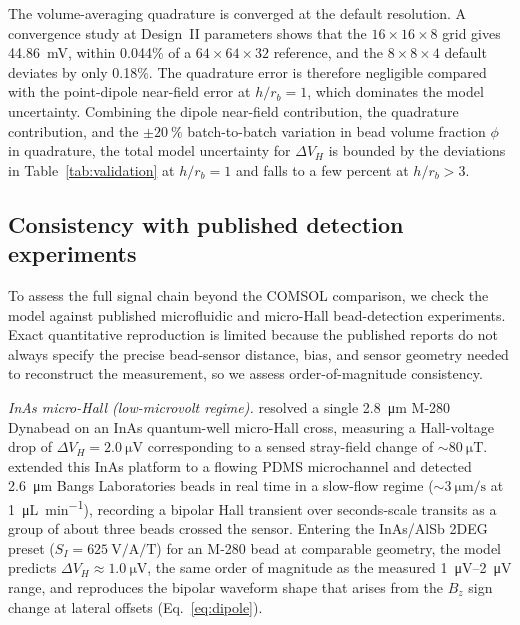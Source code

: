 \documentclass[pdflatex,sn-basic]{sn-jnl}
\theoremstyle{thmstyleone}
\theoremstyle{thmstyletwo}
\theoremstyle{thmstylethree}
\begin{document}
The volume-averaging quadrature is converged at the default resolution. A convergence study at Design~II parameters shows that the $16\times16\times8$ grid gives \SI{44.86}{\milli\volt}, within 0.044\% of a $64\times64\times32$ reference, and the $8\times8\times4$ default deviates by only 0.18\%. The quadrature error is therefore negligible compared with the point-dipole near-field error at $h/r_b = 1$, which dominates the model uncertainty. Combining the dipole near-field contribution, the quadrature contribution, and the ${\pm}\SI{20}{\percent}$ batch-to-batch variation in bead volume fraction $\phi$ \citep{fonnum2005} in quadrature, the total model uncertainty for $\Delta V_H$ is bounded by the deviations in Table~\ref{tab:validation} at $h/r_b = 1$ and falls to a few percent at $h/r_b > 3$.

\subsection{Consistency with published detection experiments}\label{sec:expvalidation}

To assess the full signal chain beyond the COMSOL comparison, we check the model against published microfluidic and micro-Hall bead-detection experiments. Exact quantitative reproduction is limited because the published reports do not always specify the precise bead-sensor distance, bias, and sensor geometry needed to reconstruct the measurement, so we assess order-of-magnitude consistency.

\textit{InAs micro-Hall (low-microvolt regime).} \citet{mihajlovic2005} resolved a single \SI{2.8}{\micro\meter} M-280 Dynabead on an InAs quantum-well micro-Hall cross, measuring a Hall-voltage drop of $\Delta V_H = \SI{2.0}{\micro\volt}$ corresponding to a sensed stray-field change of ${\sim}\SI{80}{\micro\tesla}$. \citet{aledealat2009} extended this InAs platform to a flowing PDMS microchannel and detected \SI{2.6}{\micro\meter} Bangs Laboratories beads in real time in a slow-flow regime (${\sim}\SI{3}{\micro\meter\per\second}$ at \SI{1}{\micro\liter\per\minute}), recording a bipolar Hall transient over seconds-scale transits as a group of about three beads crossed the sensor. Entering the InAs/AlSb 2DEG preset ($S_I = \SI{625}{\volt\per\ampere\per\tesla}$) for an M-280 bead at comparable geometry, the model predicts $\Delta V_H \approx \SI{1.0}{\micro\volt}$, the same order of magnitude as the measured \SIrange{1}{2}{\micro\volt} range, and reproduces the bipolar waveform shape that arises from the $B_z$ sign change at lateral offsets (Eq.~\eqref{eq:dipole}).
\end{document}
